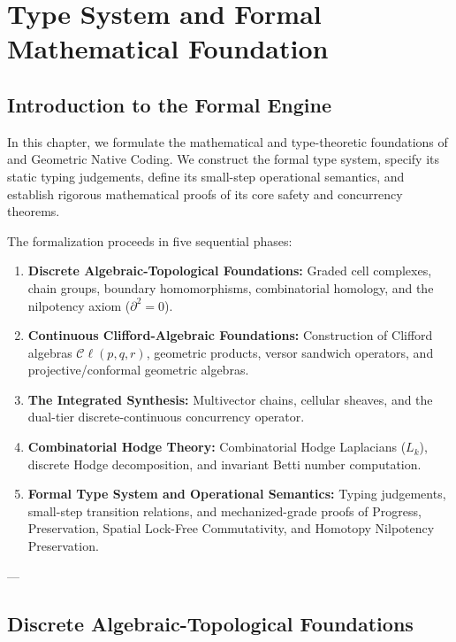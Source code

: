 \chapter{Type System and Formal Mathematical Foundation}
\label{ch:type_system}

\section{Introduction to the Formal Engine}
\label{sec:type_engine_intro}

In this chapter, we formulate the mathematical and type-theoretic foundations of \ToposLang{} and Geometric Native Coding. We construct the formal type system, specify its static typing judgements, define its small-step operational semantics, and establish rigorous mathematical proofs of its core safety and concurrency theorems.

The formalization proceeds in five sequential phases:
\begin{enumerate}[leftmargin=1.5cm]
    \item \textbf{Discrete Algebraic-Topological Foundations:} Graded cell complexes, chain groups, boundary homomorphisms, combinatorial homology, and the nilpotency axiom ($\partial^2 = 0$).
    \item \textbf{Continuous Clifford-Algebraic Foundations:} Construction of Clifford algebras $\mathcal{C}\ell(p,q,r)$, geometric products, versor sandwich operators, and projective/conformal geometric algebras.
    \item \textbf{The Integrated Synthesis:} Multivector chains, cellular sheaves, and the dual-tier discrete-continuous concurrency operator.
    \item \textbf{Combinatorial Hodge Theory:} Combinatorial Hodge Laplacians ($L_k$), discrete Hodge decomposition, and invariant Betti number computation.
    \item \textbf{Formal Type System and Operational Semantics:} Typing judgements, small-step transition relations, and mechanized-grade proofs of Progress, Preservation, Spatial Lock-Free Commutativity, and Homotopy Nilpotency Preservation.
\end{enumerate}

---

\section{Discrete Algebraic-Topological Foundations}
\label{sec:discrete_topology}

